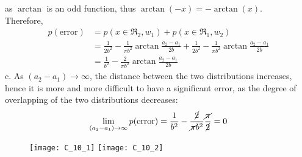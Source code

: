 as \(\arctan\) is an odd function, thus \(\arctan(-x)=-\arctan(x)\).\\
Therefore,
\begin{align*}
    p(\text{error})
    &=p(x\in\mathfrak{R}_2, w_1)+p(x\in\mathfrak{R}_1, w_2)\\
    &=\frac{1}{2b^2}-\frac{1}{\pi b^2}\arctan{\frac{a_2-a_1}{2b}}+\frac{1}{2b^2}-\frac{1}{\pi b^2}\arctan{\frac{a_2-a_1}{2b}}\\
    &=\frac{1}{b^2}-\frac{2}{\pi b^2}\arctan{\frac{a_2-a_1}{2b}}
\end{align*}
c. As \((a_2-a_1)\to\infty\), the distance between the two distributions
increases, hence it is more and more difficult to have a significant
error, as the degree of overlapping of the two distributions decreases:
\begin{align*}
    \lim_{(a_2-a_1)\to\infty}p(\text{error})=\frac{1}{b^2}-\frac{\cancel{2}}{\cancel{\pi}b^2}\frac{\cancel{\pi}}{\cancel{2}}=0
\end{align*}
\begin{figure}[H]
    \texttt{[image: C\_10\_1]}
    \texttt{[image: C\_10\_2]}
    \centering
\end{figure}